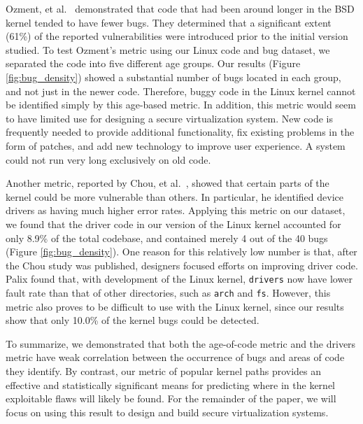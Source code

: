 Ozment, et al.~\cite{ozment2006milk} demonstrated that code that
had been around longer in the BSD kernel tended to have fewer bugs.
They determined that a significant extent (61\%) of the reported
vulnerabilities were
introduced prior to the initial version studied.
To test Ozment's metric using our Linux code and bug dataset,
we separated the code into five different age groups.
Our results (Figure \ref{fig:bug_density}) showed a substantial
number of bugs located in each group, and not just in the newer code.
Therefore, buggy code in the Linux kernel cannot be identified simply
by this age-based metric.
In addition, this metric would seem to have limited use for designing a secure
virtualization system. New code is frequently needed to provide
additional functionality,
fix existing problems in the form of patches, and add new technology to improve
user experience. A system could not run very long exclusively on old code.

Another metric, reported by Chou, et al.~\cite{PittSFIeld}, showed that certain parts of the kernel
could be more vulnerable than others. In particular, he identified device drivers as
having much higher error rates.
Applying this metric on our dataset, we found that the driver code in our version
of the Linux kernel accounted for only 8.9\% of the total codebase, and contained
merely 4 out of the 40 bugs (Figure \ref{fig:bug_density}).
One reason for this relatively low number is that, after the Chou study was published,
designers focused efforts on improving driver code. Palix \cite{palix2011faults}
found that, with development of the Linux kernel,
\texttt{drivers} now have lower fault rate than that of other directories,
such as \texttt{arch} and \texttt{fs}.
However, this metric also proves to be difficult to use with the
Linux kernel, since our results show that
only 10.0\% of the kernel bugs could be detected.

To summarize, we demonstrated that both the age-of-code metric and
the drivers metric have weak correlation between the occurrence of bugs
and areas of code they identify. By contrast, our metric of popular
kernel paths provides an effective and statistically significant
means for predicting where in the kernel exploitable flaws
will likely be found. For the remainder of the paper, we will
focus on using this result to design and build secure virtualization systems.

